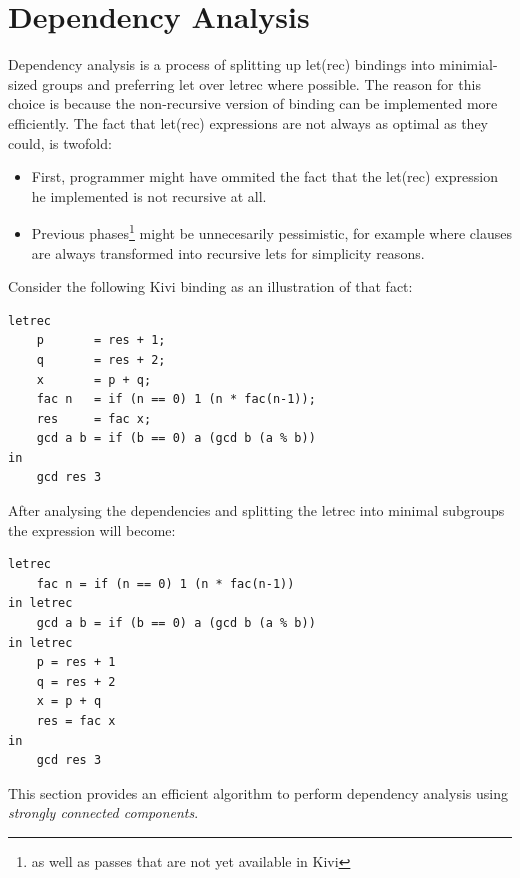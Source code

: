 \documentclass[12pt,a4paper]{report}
\begin{document}

\section{Dependency Analysis}
Dependency analysis is a process of splitting up let(rec) bindings
into minimial-sized groups and preferring let over letrec
where possible. The reason for this choice is because the non-recursive version
of binding can be implemented more efficiently. The fact that let(rec)
expressions are not always as optimal as they could, is twofold:
\begin{itemize}
  \item First, programmer might have ommited the fact that the
    let(rec) expression he implemented is not recursive at all.
  \item Previous phases\footnote{as well as passes that are not yet available
    in Kivi} might be unnecesarily pessimistic, for example where
    clauses are always transformed into recursive lets for simplicity
    reasons.
\end{itemize}
Consider the following Kivi binding as an illustration of that fact:

\vspace*{0.2in}
\begin{lstlisting}[style=haskell,label=lst:letrec_dependency_example,caption={Example of
  letrec before dependency analysis.}]
letrec
    p       = res + 1;
    q       = res + 2;
    x       = p + q;
    fac n   = if (n == 0) 1 (n * fac(n-1));
    res     = fac x;
    gcd a b = if (b == 0) a (gcd b (a % b))
in
    gcd res 3
\end{lstlisting}
After analysing the dependencies and splitting the letrec into minimal
subgroups the expression will become:

\vspace*{0.2in}
\begin{lstlisting}[style=haskell,label=lst:letrec_after_anlysis,caption={letrec
  after performing dependency anlysis.}]
letrec
    fac n = if (n == 0) 1 (n * fac(n-1))
in letrec
    gcd a b = if (b == 0) a (gcd b (a % b))
in letrec
    p = res + 1
    q = res + 2
    x = p + q
    res = fac x
in
    gcd res 3
\end{lstlisting}
This section provides an efficient algorithm to perform dependency analysis
using \textit{strongly connected components}.
\end{document}
